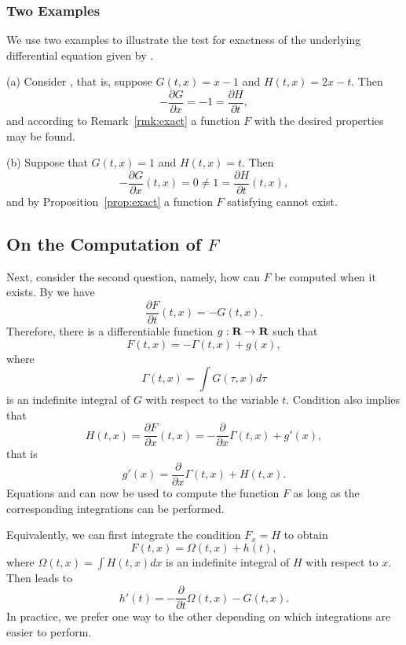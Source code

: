 \documentclass{ximera}
\begin{document}
\subsubsection*{Two Examples}

We use two examples to illustrate the test for exactness
of the underlying differential equation given by .

\noindent (a) Consider , that is, suppose $G(t,x)=x-1$ and 
$H(t,x)=2x-t$.  Then
\[
-\frac{\partial G}{\partial x} = -1 = 
\frac{\partial H}{\partial t},
\]
and according to Remark~\ref{rmk:exact} a function $F$ with the desired 
properties may be found.

\noindent (b) Suppose that $G(t,x) = 1$ and $H(t,x) = t$.  Then 
\[
-\frac{\partial G}{\partial x} (t,x) = 0\not= 1 = 
\frac{\partial H}{\partial t} (t,x),
\]
and by Proposition~\ref{prop:exact} a function $F$ satisfying  
cannot exist.

\subsection*{On the Computation of $F$}
Next, consider the second question, namely, how can $F$ be
computed when it exists.  By  we have
\[
\frac{\partial F}{\partial t}(t,x) = -G(t,x).
\]
Therefore, there is a differentiable function $g:\mbox{$\bf{R}$}\to\mbox{$\bf{R}$}$ such
that
\begin{equation}  \label{eq:defGamma}
F(t,x) = -\Gamma(t,x) + g(x),
\end{equation}
where 
\[
\Gamma(t,x)=\int G(\tau,x) d\tau
\]
is an indefinite integral of $G$ with respect to the variable $t$.
Condition  also implies that
\[
H(t,x) = \frac{\partial F}{\partial x}(t,x) =
-\frac{\partial}{\partial x}\Gamma(t,x) + g'(x),
\]
that is
\begin{equation} \label{eq:defg}
g'(x) = \frac{\partial}{\partial x}\Gamma(t,x) + H(t,x).
\end{equation}
Equations  and  can now be used 
to compute the function $F$ as long as the corresponding
integrations can be performed.  

Equivalently, we can first integrate the condition $F_x=H$ to obtain
\begin{equation}  \label{eq:excond}
F(t,x) = \Omega(t,x) + h(t),
\end{equation}
where $\Omega(t,x)=\int H(t,x)dx$ is an indefinite integral of $H$ with
respect to $x$.  Then  leads to
\[
h'(t) = -\frac{\partial}{\partial t}\Omega(t,x) - G(t,x).
\]
In practice, we prefer one way to the other depending on which
integrations are easier to perform.
\end{document}
